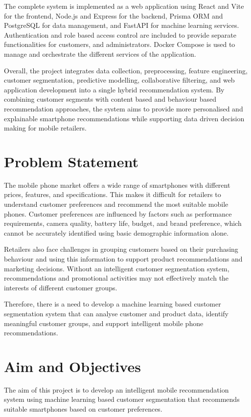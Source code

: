 \documentclass[12pt]{report}
\numberwithin{figure}{chapter}
\numberwithin{table}{chapter}
\numberwithin{equation}{chapter}
\begin{document}
The complete system is implemented as a web application using React and Vite for the frontend, Node.js and Express for the backend, Prisma ORM and PostgreSQL for data management, and FastAPI for machine learning services. Authentication and role based access control are included to provide separate functionalities for customers, and administrators. Docker Compose is used to manage and orchestrate the different services of the application.

Overall, the project integrates data collection, preprocessing, feature engineering, customer segmentation, predictive modelling, collaborative filtering, and web application development into a single hybrid recommendation system. By combining customer segments with content based and behaviour based recommendation approaches, the system aims to provide more personalised and explainable smartphone recommendations while supporting data driven decision making for mobile retailers.

\section{Problem Statement}
The mobile phone market offers a wide range of smartphones with different prices, features, and specifications. This makes it difficult for retailers to understand customer preferences and recommend the most suitable mobile phones. Customer preferences are influenced by factors such as performance requirements, camera quality, battery life, budget, and brand preference, which cannot be accurately identified using basic demographic information alone.

Retailers also face challenges in grouping customers based on their purchasing behaviour and using this information to support product recommendations and marketing decisions. Without an intelligent customer segmentation system, recommendations and promotional activities may not effectively match the interests of different customer groups.

Therefore, there is a need to develop a machine learning based customer segmentation system that can analyse customer and product data, identify meaningful customer groups, and support intelligent mobile phone recommendations.

\section{Aim and Objectives}

The aim of this project is to develop an intelligent mobile recommendation system using machine learning based customer segmentation that recommends suitable smartphones based on customer preferences.
\end{document}
